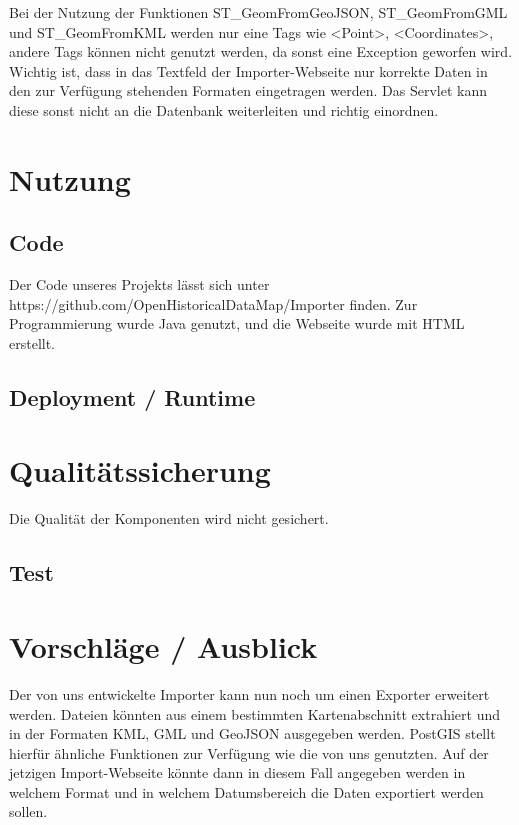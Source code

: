 \documentclass[]{article}
\begin{document}
Bei der Nutzung der Funktionen ST\_GeomFromGeoJSON, ST\_GeomFromGML und ST\_GeomFromKML werden nur eine Tags wie <Point>, <Coordinates>, andere Tags können nicht genutzt werden, da sonst eine Exception geworfen wird. Wichtig ist, dass in das Textfeld der Importer-Webseite nur korrekte Daten in den zur Verfügung stehenden Formaten eingetragen werden. Das Servlet kann diese sonst nicht an die Datenbank weiterleiten und richtig einordnen.

\section{Nutzung}
\subsection{Code}
Der Code unseres Projekts lässt sich unter https://github.com/OpenHistoricalDataMap/Importer finden. Zur Programmierung wurde Java genutzt, und die Webseite wurde mit HTML erstellt.

\subsection{Deployment / Runtime}

\section{Qualitätssicherung}
Die Qualität der Komponenten wird nicht gesichert. 

\subsection{Test}


\section{Vorschläge / Ausblick}
Der von uns entwickelte Importer kann nun noch um einen Exporter erweitert werden. Dateien könnten aus einem bestimmten Kartenabschnitt extrahiert und in der Formaten KML, GML und GeoJSON ausgegeben werden. PostGIS stellt hierfür ähnliche Funktionen zur Verfügung wie die von uns genutzten. Auf der jetzigen Import-Webseite könnte dann in diesem Fall angegeben werden in welchem Format und in welchem Datumsbereich die Daten exportiert werden sollen.
\end{document}
